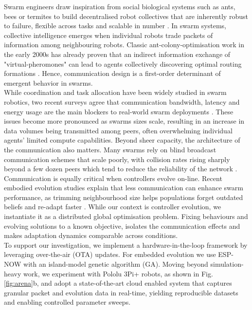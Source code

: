 \documentclass[conference]{IEEEtran}
\begin{document}
Swarm engineers draw inspiration from social biological systems such as ants, bees or termites to build decentralised robot collectives that are inherently robust to failure, flexible across tasks and scalable in number \cite{hamann_swarm_2018}. In swarm systems, collective intelligence emerges when individual robots trade packets of information among neighbouring robots. Classic ant-colony-optimisation work in the early 2000s has already proven that an indirect information exchange of "virtual-pheromones" can lead to agents collectively discovering optimal routing formations \cite{dorigo_ant_2000}. Hence, communication design is a first-order determinant of emergent behavior in swarms. \\

While coordination and task allocation have been widely studied in swarm robotics, two recent surveys agree that communication bandwidth, latency and energy usage are the main blockers to real-world swarm deployments \cite{ding_advancements_2023}\cite{an_multi-robot_2023}. These issues become more pronounced as swarms sizes scale, resulting in an increase in data volumes being transmitted among peers, often overwhelming individual agents' limited compute capabilities. Beyond sheer capacity, the architecture of the communication also matters. Many swarms rely on blind broadcast communication schemes that scale poorly, with collision rates rising sharply beyond a few dozen peers which tend to reduce the reliability of the network \cite{an_multi-robot_2023}. \\

Communication is equally critical when controllers evolve on-line. Recent embodied evolution studies explain that less communication can enhance swarm performance, as trimming neighbourhood size helps populations forget outdated beliefs and re-adapt faster \cite{hiraga_when_2023}\cite{ding_advancements_2023}. While our context is controller evolution, we instantiate it as a distributed global optimisation problem. Fixing behaviours and evolving solutions to a known objective, isolates the communication effects and makes adaptation dynamics comparable across conditions. \\

To support our investigation, we implement a hardware-in-the-loop framework by leveraging over-the-air (OTA) updates. For embedded evolution we use ESP-NOW with an island-model genetic algorithm (GA). Moving beyond simulation-heavy work, we experiment with Pololu 3Pi+ robots, as shown in Fig. \ref{fig:arena}b, and adopt a state-of-the-art cloud enabled system that captures granular packet and evolution data in real-time, yielding reproducible datasets and enabling controlled parameter sweeps.
\end{document}
